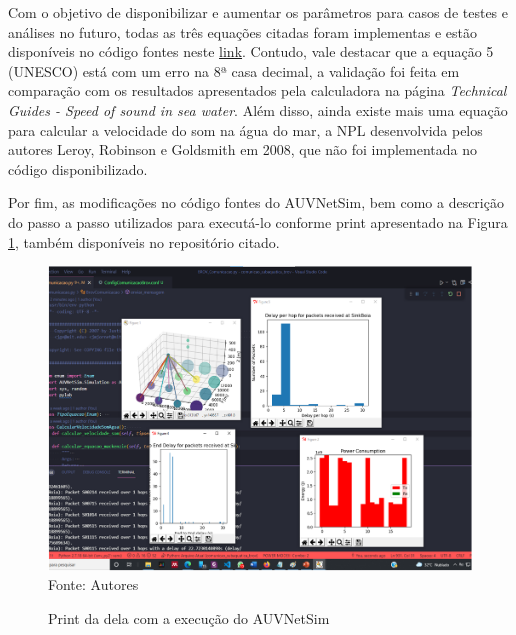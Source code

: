 Com o objetivo de disponibilizar e aumentar os parâmetros para casos de testes e análises no futuro, todas as três equações citadas foram implementas e estão disponíveis no código fontes neste \href{https://github.com/maxsilva24/comunicao_subaquatica_brov}{link}. Contudo, vale destacar que a equação 5 (UNESCO) está com um erro na 8ª casa decimal, a validação foi feita em comparação com os resultados apresentados pela calculadora na página\textit{ Technical Guides - Speed of sound in sea water}. Além disso, ainda existe mais uma equação para calcular a velocidade do som na água do mar, a NPL desenvolvida pelos autores Leroy, Robinson e Goldsmith em 2008, que não foi implementada no código disponibilizado.

Por fim, as modificações no código fontes do AUVNetSim, bem como a descrição do passo a passo utilizados para executá-lo conforme print apresentado na Figura \ref{fig:print-auvnetsim}, também disponíveis no repositório citado.

\begin{figure}[h]
	\centering
	\caption[Print da dela com a execução do AUVNetSim]{Print da dela com a execução do AUVNetSim}
	\label{fig:print-auvnetsim}
	\includegraphics[width=0.8\linewidth]{images/print-auvnetsim}\\
	\footnotesize Fonte: Autores
\end{figure}

